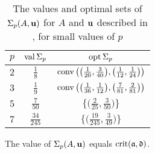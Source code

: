 \documentclass[11pt]{amsart}
\begin{document}
\begin{example}
\begin{table}
\begin{center}
\begingroup
\setlength{\tabcolsep}{8pt} %
\renewcommand{\arraystretch}{1.4} %
\begin{tabular}{ccc}
  \toprule
  $p$ & $\operatorname{val} \Sigma_p$ & $\operatorname{opt} \Sigma_p$  \\
  \midrule
  $2$ & $\frac18$ & $\operatorname{conv}\big(\big(\frac1{20}, \frac3{40}\big),\big(\frac1{12}, \frac1{24}\big)\big)$ \\
  $3$ & $\frac19$ & $\operatorname{conv}\big(\big(\frac{1}{36}, \frac1{12}\big),\big(\frac7{81}, \frac2{81}\big)\big)$ \\
  $5$ & $\frac7{50}$ & $\big\{\big(\frac2{25}, \frac3{50}\big) \big\}$  \\
  $7$ & $\frac{34}{245}$ & $\big\{\big(\frac{19}{245}, \frac3{49}\big) \}$ \\
  \bottomrule
\end{tabular}
\endgroup
\end{center}
\medskip
\caption{The values and optimal sets of $\Sigma_p(A, \mathbf{u})$ for $A$ and $\mathbf{u}$ described in , for small values of $p$}
\label{table: feas fip details}
\end{table}


\end{example}


\begin{proposition}
The value of $\Sigma_p(A,\mathbf{u})$ equals $\operatorname{crit}(\mathfrak{a}, \mathfrak{d})$.
\end{proposition}
\end{document}
